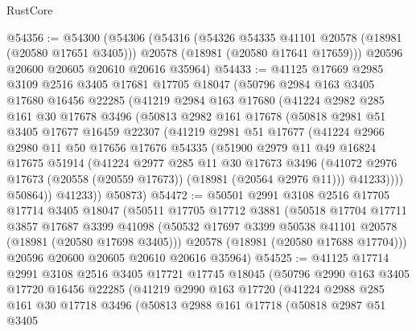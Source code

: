 \begin{lexlean}{RustCore}
\begin{coremodule}
@54356 := @54300
    (@54306
      (@54316
        (@54326 @54335 @41101 @20578 (@18981 (@20580 @17651 @3405)))
        @20578
        (@18981 (@20580 @17641 @17659)))
      @20596
      @20600
      @20605
      @20610
      @20616
      @35964)
@54433 := @41125
    @17669
    @2985
    @3109
    @2516
    @3405
    @17681
    @17705
    @18047
    (@50796
      @2984
      @163
      @3405
      @17680
      @16456
      @22285
      (@41219
        @2984
        @163
        @17680
        (@41224
          @2982
          @285
          @161
          @30
          @17678
          @3496
          (@50813
            @2982
            @161
            @17678
            (@50818
              @2981
              @51
              @3405
              @17677
              @16459
              @22307
              (@41219
                @2981
                @51
                @17677
                (@41224
                  @2966
                  @2980
                  @11
                  @50
                  @17656
                  @17676
                  @54335
                  (@51900
                    @2979
                    @11
                    @49
                    @16824
                    @17675
                    @51914
                    (@41224
                      @2977
                      @285
                      @11
                      @30
                      @17673
                      @3496
                      (@41072 @2976 @17673 (@20558 (@20559 @17673)) (@18981 (@20564 @2976 @11)))
                      @41233))))
              @50864))
          @41233))
      @50873)
@54472 := @50501
    @2991
    @3108
    @2516
    @17705
    @17714
    @3405
    @18047
    (@50511
      @17705
      @17712
      @3881
      (@50518
        @17704
        @17711
        @3857
        @17687
        @3399
        @41098
        (@50532 @17697 @3399 @50538 @41101 @20578 (@18981 (@20580 @17698 @3405)))
        @20578
        (@18981 (@20580 @17688 @17704)))
      @20596
      @20600
      @20605
      @20610
      @20616
      @35964)
@54525 := @41125
    @17714
    @2991
    @3108
    @2516
    @3405
    @17721
    @17745
    @18045
    (@50796
      @2990
      @163
      @3405
      @17720
      @16456
      @22285
      (@41219
        @2990
        @163
        @17720
        (@41224
          @2988
          @285
          @161
          @30
          @17718
          @3496
          (@50813
            @2988
            @161
            @17718
            (@50818
              @2987
              @51
              @3405

\end{coremodule}
\end{lexlean}
